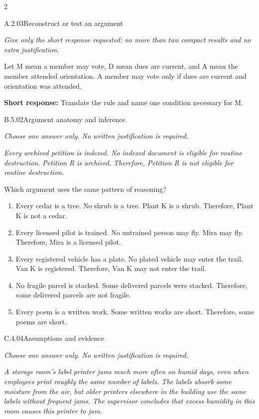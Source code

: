 \documentclass[9pt]{extarticle}
\newcommand{\choice}[1]{\item #1}
\begin{document}
\begin{multicols}{2}
\begin{DenseCoreProblem}{A.2.03}{Reconstruct or test an argument}
{\scriptsize\textit{Give only the short response requested: no more than two compact results and no extra justification.}\par}
Let M mean a member may vote, D mean dues are current, and A mean the member attended orientation. A member may vote only if dues are current and orientation was attended.

\textbf{Short response:} Translate the rule and name one condition necessary for M.
\end{DenseCoreProblem}
\begin{DenseCoreProblem}{B.5.02}{Argument anatomy and inference}
{\scriptsize\textit{Choose one answer only. No written justification is required.}\par}
\emph{Every archived petition is indexed. No indexed document is eligible for routine destruction. Petition R is archived. Therefore, Petition R is not eligible for routine destruction.}

Which argument uses the same pattern of reasoning?
\begin{enumerate}[label=(\alph*)]
  \choice{Every cedar is a tree. No shrub is a tree. Plant K is a shrub. Therefore, Plant K is not a cedar.}
  \choice{Every licensed pilot is trained. No untrained person may fly. Mira may fly. Therefore, Mira is a licensed pilot.}
  \choice{Every registered vehicle has a plate. No plated vehicle may enter the trail. Van K is registered. Therefore, Van K may not enter the trail.}
  \choice{No fragile parcel is stacked. Some delivered parcels were stacked. Therefore, some delivered parcels are not fragile.}
  \choice{Every poem is a written work. Some written works are short. Therefore, some poems are short.}
\end{enumerate}
\end{DenseCoreProblem}
\columnbreak
\begin{DenseCoreProblem}{C.4.04}{Assumptions and evidence}
{\scriptsize\textit{Choose one answer only. No written justification is required.}\par}
\emph{A storage room's label printer jams much more often on humid days, even when employees print roughly the same number of labels. The labels absorb some moisture from the air, but older printers elsewhere in the building use the same labels without frequent jams. The supervisor concludes that excess humidity in this room causes this printer to jam.}


\end{DenseCoreProblem}
\end{multicols}
\end{document}
